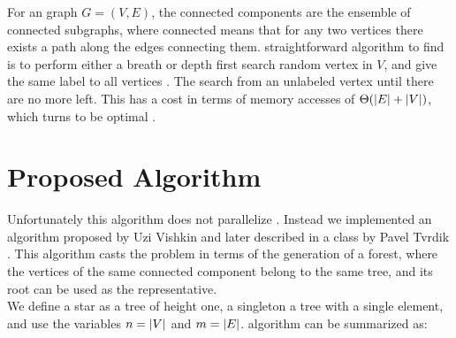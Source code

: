 %

For an  graph $G=(V,E)$, the connected components are the ensemble
of connected subgraphs, where connected means that for any two vertices there exists a path along the edges connecting them.
 straightforward algorithm to find  is to perform either a breath or depth first search  random vertex in $V$, and give the same label to all  vertices .  The search  from an unlabeled vertex
until there are no more  left.
This has a cost in terms of memory accesses of $\Theta(\left| E \right| + \left| V \right|)$, which turns  to be optimal \cite{Hopcroft}.

\section{Proposed Algorithm}\label{sec:yourmethod}
%
%


Unfortunately this algorithm does not parallelize . Instead we  implemented
an algorithm proposed by Uzi Vishkin \cite{PCompPaper} and later described in a class by Pavel Tvrdik \cite{PCompClass}. This algorithm casts the problem in terms of the generation of a
forest, where the vertices of the same connected component belong to the same tree, and its root
can be used as the representative.\\
We define a star as a tree of height one, a singleton  a tree with a single element, and use the variables $n=\left| V \right|$ and $m=\left| E \right|$.
 algorithm can be summarized as:

